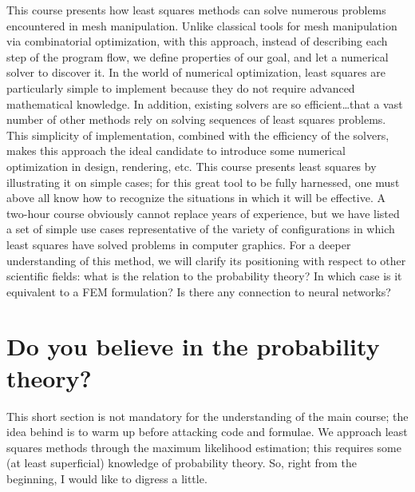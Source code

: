 \documentclass[notitlepage,oneside]{book}
\makeatletter
\newcommand{\authoredby}[1]{\addtocontents{toc}{\protect\@nameuse{authoredby#1}}}%
\makeatother
\begin{document}
This course presents how least squares methods can solve numerous problems encountered in mesh manipulation.
Unlike classical tools for mesh manipulation via combinatorial optimization, with this approach, instead of describing each step of the program flow,
we define properties of our goal, and let a numerical solver to discover it.
In the world of numerical optimization, least squares are particularly simple to implement because they do not require advanced mathematical knowledge.
In addition, existing solvers are so efficient\dots that a vast number of other methods rely on solving sequences of least squares problems.
This simplicity of implementation, combined with the efficiency of the solvers, makes this approach the ideal candidate to introduce some numerical optimization in design, rendering, etc.
This course presents least squares by illustrating it on simple cases; for this great tool to be fully harnessed, one must above all know how to recognize the situations in which it will be effective.
A two-hour course obviously cannot replace years of experience, but we have listed a set of simple use cases representative of the variety of configurations in which least squares have solved problems in computer graphics.
For a deeper understanding of this method, we will clarify its positioning with respect to other scientific fields: what is the relation to the probability theory?
In which case is it equivalent to a FEM formulation? Is there any connection to neural networks?
\fi













\authoredby{A}
\chapter{Do you believe in the probability theory?}
\fancyhead[R]{\textcolor{blue}{optional for reading}}

This short section is not mandatory for the understanding of the main course; the idea behind is to warm up before attacking code and formulae.
We approach least squares methods through the maximum likelihood estimation; this requires some (at least superficial) knowledge of probability theory.
So, right from the beginning, I would like to digress a little.
\end{document}
